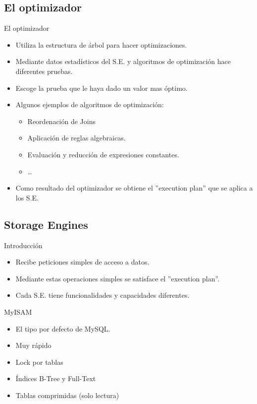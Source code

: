 \subsection{El optimizador}
\begin{frame}{El optimizador}
  \begin{itemize}
    \item Utiliza la estructura de árbol para hacer optimizaciones.
    \item Mediante datos estadísticos del S.E. y algoritmos de optimización hace diferentes pruebas.
    \item Escoge la prueba que le haya dado un valor mas óptimo.
    \item Algunos ejemplos de algoritmos de optimización:
    \begin{itemize}
      \item Reordenación de Joins
      \item Aplicación de reglas algebraicas.
      \item Evaluación y reducción de expresiones constantes.
      \item \dots
    \end{itemize}
    \item Como resultado del optimizador se obtiene el ''execution plan'' que se aplica a los S.E.
  \end{itemize}
\end{frame}

\subsection{Storage Engines}
\begin{frame}{Introducción}
  \begin{itemize}
    \item Recibe peticiones simples de acceso a datos.
    \item Mediante estas operaciones simples se satisface el ''execution plan''.
    \item Cada S.E. tiene funcionalidades y capacidades diferentes.
  \end{itemize}
\end{frame}

\begin{frame}{MyISAM}
  \begin{itemize}
    \item El tipo por defecto de MySQL.
    \item Muy rápido
    \item Lock por tablas
    \item Índices B-Tree y Full-Text
    \item Tablas comprimidas (solo lectura)
  \end{itemize}
\end{frame}

